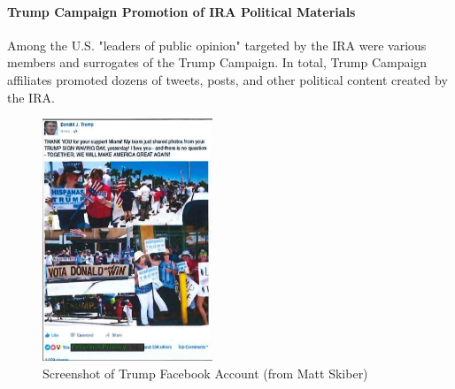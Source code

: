 \paragraph{Trump Campaign Promotion of IRA Political Materials}

Among the U.S. "leaders of public opinion" targeted by the IRA were various members and surrogates of the Trump Campaign.
In total, Trump Campaign affiliates promoted dozens of tweets, posts, and other political content created by the IRA\null.

\begin{figure}
    \vspace{-20pt}
    \begin{center}
        \includegraphics[width=2in]{images/p-34-trump-facebook.png}%
    \end{center}
    \vspace{-20pt}
    \caption*{Screenshot of Trump Facebook Account (from Matt Skiber)}
    \vspace{-10pt}
    \label{fig:trump-facebook}
\end{figure}


